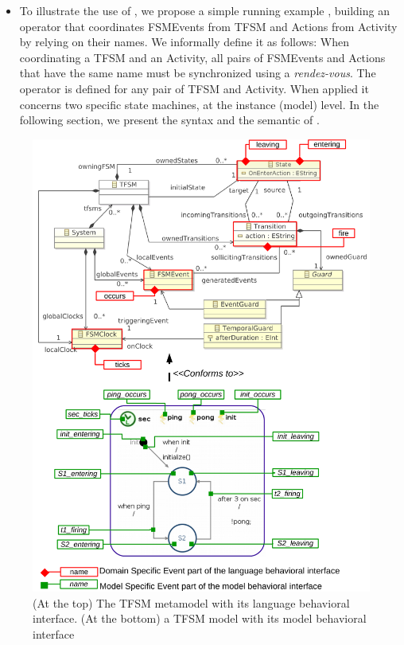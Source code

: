 \begin{itemize}
	\item To illustrate the use of \bcool, we propose a simple running example \ie, building an operator that coordinates FSMEvents from TFSM and Actions from Activity by relying on their names. We informally define it as follows: When coordinating a TFSM and an Activity, all pairs of FSMEvents and Actions that have the same name must be synchronized using a \emph{rendez-vous}. The operator is defined for any pair of TFSM and Activity. When applied it concerns two specific state machines, at the instance (model) level. In the following section, we present the syntax and the semantic of \bcool.
	
\end{itemize}



\begin{figure}
	\begin{center}
		\includegraphics[width=1\textwidth]{bcool/figs/tfsmlang}
		\caption{(At the top) The TFSM metamodel with its language behavioral interface. (At the bottom) a TFSM model with its model behavioral interface}
		\label{fig:tfsmmm}
	\end{center}
\end{figure}

